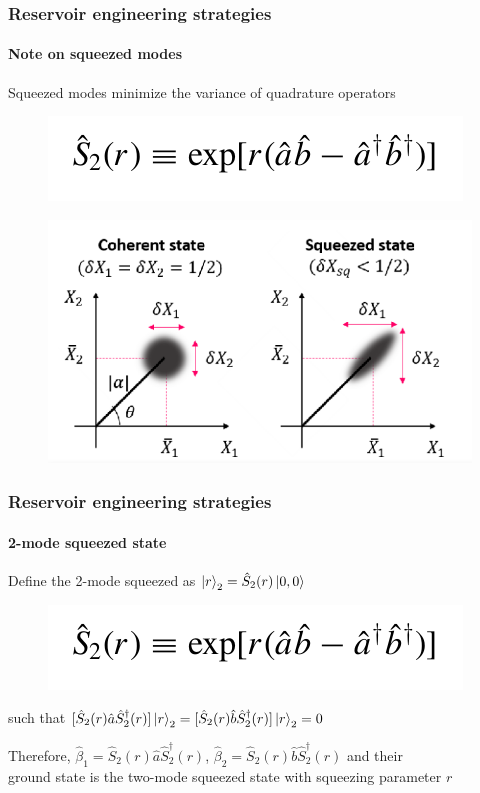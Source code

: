 \documentclass[aspectratio=43]{beamer}
\begin{document}
\begin{frame}

	\frametitle{Reservoir engineering strategies}
	\framesubtitle{Note on squeezed modes}
	
	Squeezed modes minimize the variance of quadrature operators
	\begin{figure}
		\includegraphics[width = 5 cm]{plots/2_squeezed_mode.png}
	\end{figure}	
	
	\begin{figure}
		\includegraphics[width = 7 cm]{plots/plot_squeezed.png}
	\end{figure}

\end{frame}

\begin{frame}
	
	\frametitle{Reservoir engineering strategies}
	\framesubtitle{2-mode squeezed state}
	
	Define the 2-mode squeezed as $\ket{r}_{2} = \hat{S}_{2}(r) \ket{0,0}$
	\begin{figure}
		\includegraphics[width = 5 cm]{plots/2_squeezed_mode.png}
	\end{figure}	

	such that $[\hat{S}_{2}(r) \hat{a} \hat{S}_{2}^{\dagger}(r)]\ket{r}_{2} = [\hat{S}_{2}(r) \hat{b} \hat{S}_{2}^{\dagger}(r)]\ket{r}_{2} = 0$\\
	
	\vspace{0.5cm}
	
	Therefore, $\hat{\beta}_{1} = \hat{S}_{2}(r) \hat{a} \hat{S}_{2}^{\dagger}(r)$, $\hat{\beta}_{2} = \hat{S}_{2}(r) \hat{b} \hat{S}_{2}^{\dagger}(r)$ and their\\ground state is the two-mode squeezed state with squeezing parameter $r$

\end{frame}
\end{document}
